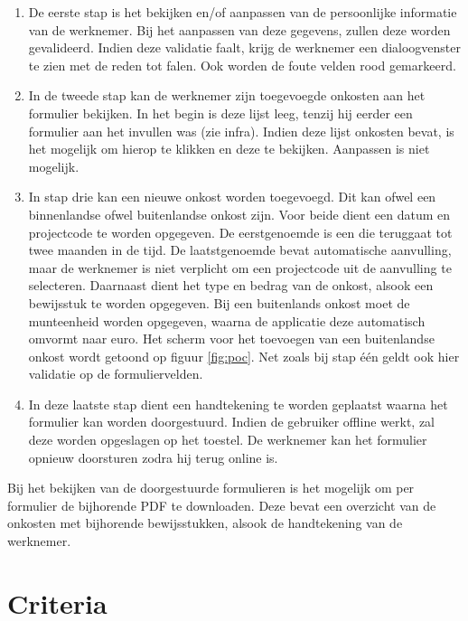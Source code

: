 \begin{enumerate}
\item De eerste stap is het bekijken en/of aanpassen van de persoonlijke informatie van de werknemer.
Bij het aanpassen van deze gegevens, zullen deze worden gevalideerd.
Indien deze validatie faalt, krijg de werknemer een dialoogvenster te zien met de reden tot falen.
Ook worden de foute velden rood gemarkeerd.

\item In de tweede stap kan de werknemer zijn toegevoegde onkosten aan het formulier bekijken.
In het begin is deze lijst leeg, tenzij hij eerder een formulier aan het invullen was (zie infra).
Indien deze lijst onkosten bevat, is het mogelijk om hierop te klikken en deze te bekijken. Aanpassen is niet mogelijk.

\item In stap drie kan een nieuwe onkost worden toegevoegd.
Dit kan ofwel een binnenlandse ofwel buitenlandse onkost zijn.
Voor beide dient een datum en projectcode te worden opgegeven.
De eerstgenoemde is een  die teruggaat tot twee maanden in de tijd.
De laatstgenoemde bevat automatische aanvulling, maar de werknemer is niet verplicht om een projectcode uit de aanvulling te selecteren.
Daarnaast dient het type en bedrag van de onkost, alsook een bewijsstuk te worden opgegeven.
Bij een buitenlands onkost moet de munteenheid worden opgegeven, waarna de applicatie deze automatisch omvormt naar euro.
Het scherm voor het toevoegen van een buitenlandse onkost wordt getoond op figuur \ref{fig:poc}. 
Net zoals bij stap één geldt ook hier validatie op de formuliervelden.

\item In deze laatste stap dient een handtekening te worden geplaatst waarna het formulier kan worden doorgestuurd.
Indien de gebruiker offline werkt, zal deze worden opgeslagen op het toestel.
De werknemer kan het formulier opnieuw doorsturen zodra hij terug online is.

\end{enumerate}

Bij het bekijken van de doorgestuurde formulieren is het mogelijk om per formulier de bijhorende PDF te downloaden. 
Deze bevat een overzicht van de onkosten met bijhorende bewijsstukken, alsook de handtekening van de werknemer.

\section{Criteria}
\label{sec:vergelijking-criteria}

